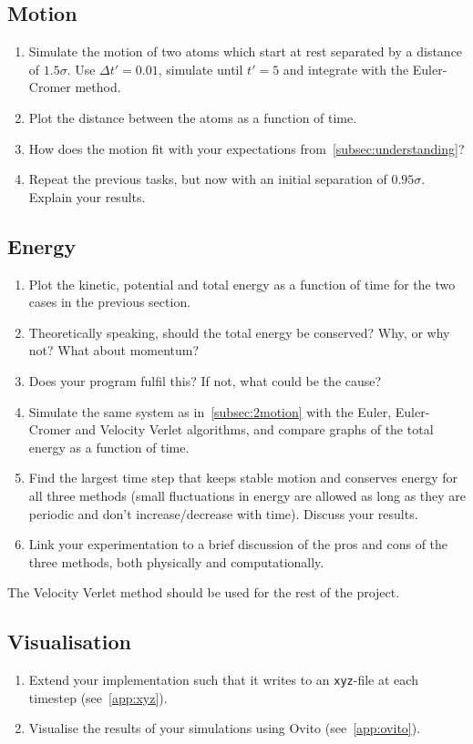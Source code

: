 \documentclass[11pt,british,a4paper]{report}
\begin{document}
\subsection{Motion}\label{subsec:2motion}
\begin{enumerate}[label=\roman*.]
    \item Simulate the motion of two atoms which start at rest separated by a distance of \(\num{1.5}\sigma\). Use \(\Delta t'=\num{0.01}\), simulate until \(t'=5\) and integrate with the Euler-Cromer method.
    \item Plot the distance between the atoms as a function of time.
    \item How does the motion fit with your expectations from~\vref{subsec:understanding}?
    \item Repeat the previous tasks, but now with an initial separation of \(\num{0.95}\sigma\). Explain your results.
\end{enumerate}

\subsection{Energy}
\begin{enumerate}[label=\roman*.]
    \item Plot the kinetic, potential and total energy as a function of time for the two cases in the previous section.
    \item Theoretically speaking, should the total energy be conserved? Why, or why not? What about momentum?
    \item Does your program fulfil this? If not, what could be the cause?
    \item Simulate the same system as in~\vref{subsec:2motion} with the Euler, Euler-Cromer and Velocity Verlet algorithms, and compare graphs of the total energy as a function of time.
    \item Find the largest time step that keeps stable motion and conserves energy for all three methods (small fluctuations in energy are allowed as long as they are periodic and don't increase/decrease with time). Discuss your results.
    \item Link your experimentation to a brief discussion of the pros and cons of the three methods, both physically and computationally.
\end{enumerate}

The Velocity Verlet method should be used for the rest of the project.

\subsection{Visualisation}
\begin{enumerate}[label=\roman*.]
    \item Extend your implementation such that it writes to an \texttt{xyz}-file at each timestep (see~\vref{app:xyz}).
    \item Visualise the results of your simulations using Ovito (see~\vref{app:ovito}).
\end{enumerate}
\end{document}
